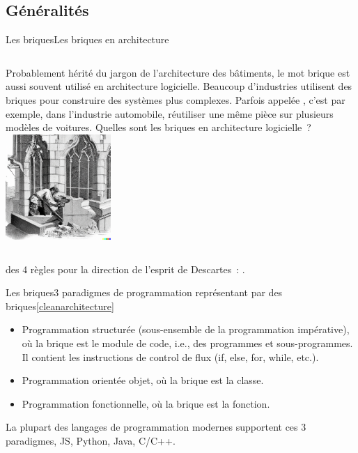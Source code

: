 \documentclass{beamer}
\begin{document}
    \subsection{Généralités}\label{subsec:briques-generalites}
    \begin{frame}{Les briques}{Les briques en architecture}
        \begin{columns}
            Probablement hérité du jargon de l'architecture des bâtiments, le mot brique est aussi souvent utilisé en architecture logicielle.
            \bigbreak
            Beaucoup d'industries utilisent des briques pour construire des systèmes plus complexes.
            Parfois appelée , c'est par exemple, dans l'industrie automobile, réutiliser une même pièce sur plusieurs modèles de voitures.
            \bigbreak
            Quelles sont les briques en architecture logicielle~?
            \centering
            \includegraphics[width=4cm]{image/engraving-of-a-craftman-cutting-a-stone}
        \end{columns}
        \bigbreak
         des 4 règles pour la direction de l'esprit de Descartes~: .
    \end{frame}

    \begin{frame}{Les briques}{3 paradigmes de programmation représentant par des briques\cref{cleanarchitecture}}
        \begin{itemize}
            \item Programmation structurée (sous-ensemble de la programmation impérative), où la brique est le module de code, i.e., des programmes et sous-programmes.
            Il contient les instructions de control de flux (if, else, for, while, etc.).
            \item Programmation orientée objet, où la brique est la classe.
            \item Programmation fonctionnelle, où la brique est la fonction.
        \end{itemize}
        \bigbreak
        La plupart des langages de programmation modernes supportent ces 3 paradigmes, JS, Python, Java, C/C++.
    \end{frame}
\end{document}
